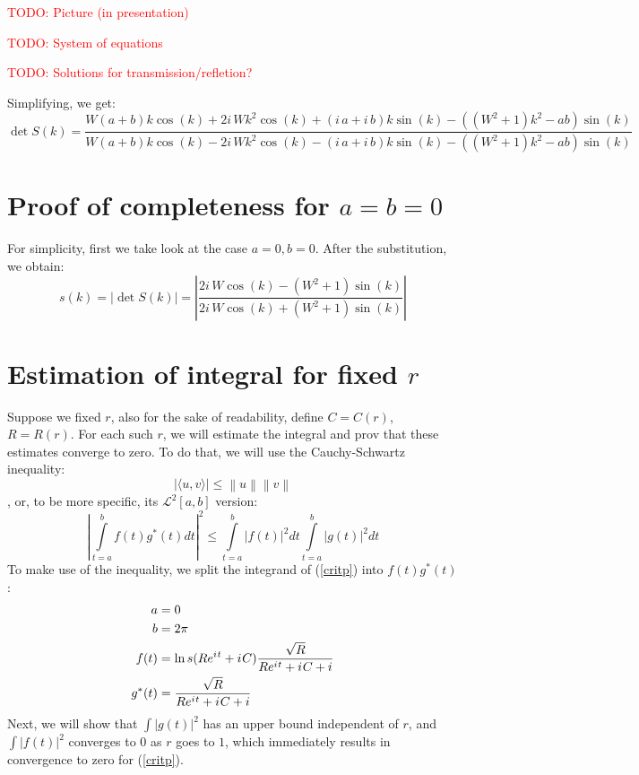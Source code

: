 \documentclass[12pt, a4paper]{article}
\newcommand{\abs}[1]{\left| #1 \right|}
\newcommand{\mcL}{\mathcal{L}}
\newcommand{\eexp}[1]{e^{#1}}
\newcommand{\iu}{{i\mkern1mu}}
\newcommand{\todo}[1]{{\large \textcolor{red}{TODO: #1}}}
\begin{document}
\todo{Picture (in presentation)}

\todo{System of equations}

\todo{Solutions for transmission/refletion?}

Simplifying, we get:
\[
\det S(k) = \frac{W {\left(a + b\right)} k \cos\left(k\right) + 2 i \, W k^{2} \cos\left(k\right) + {\left(i \, a + i \, b\right)} k \sin\left(k\right) - {\left({\left(W^{2} + 1\right)} k^{2} - a b\right)} \sin\left(k\right)}{W {\left(a + b\right)} k \cos\left(k\right) - 2 i \, W k^{2} \cos\left(k\right) - {\left(i \, a + i \, b\right)} k \sin\left(k\right) - {\left({\left(W^{2} + 1\right)} k^{2} - a b\right)} \sin\left(k\right)}
\]


\section{Proof of completeness for $a = b = 0$}
For simplicity, first we take look at the case $a = 0, b = 0$. After the substitution, we obtain:
\[
s(k) = \abs{\det S(k)} = \abs{\frac{2 i \, W \cos\left(k\right) - {\left(W^{2} + 1\right)} \sin\left(k\right)}{2 i \, W \cos\left(k\right) + {\left(W^{2} + 1\right)} \sin\left(k\right)}}
\]

\section{Estimation of integral for fixed $r$}

Suppose we fixed $r$, also for the sake of readability, define $C = C(r)$, $R = R(r)$. For each such $r$, we will estimate the integral and prov that these estimates converge to zero. To do that, we will use the Cauchy-Schwartz inequality:
\[
\big| \langle u,v \rangle \big| \leq \left\|u\right\| \left\|v\right\|
\]
, or, to be more specific, its $\mcL^2[a, b]$ version:
\[
\abs{
\int\limits_{t=a}^{b} f(t) g^*(t) dt
}^2
\le
\int\limits_{t=a}^b \abs{f(t)}^2 dt 
\int\limits_{t=a}^b \abs{g(t)}^2 dt 
\]
% 
To make use of the inequality, we split the integrand of (\ref{critp}) into $f(t) g^*(t)$:
\begin{align*}
a      &= 0 \\
b      &= 2 \pi \\
f(t)   &= \ln s(R \eexp{\iu t} + \iu C) \frac{\sqrt{R}}{R \eexp{\iu t} + \iu C + i} \\
g^*(t) &= \frac{\sqrt{R}}{R \eexp{\iu t} + \iu C + i}
\end{align*}
Next, we will show that $\int \abs{g(t)}^2$ has an upper bound independent of $r$, and $\int \abs{f(t)}^2$ converges to $0$ as $r$ goes to $1$, which immediately results in convergence to zero for (\ref{critp}).
\end{document}
